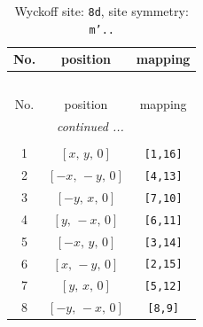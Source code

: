 \documentclass[fleqn,8pt]{jsarticle}
\begin{document}
\renewcommand{\arraystretch}{1.2}
\begin{longtable}{ccc}
\caption{Wyckoff site: {\tt 8d}, site symmetry: {\tt m'..}}
 \\
 \hline \hline
No. & position & mapping \\ \hline \endfirsthead

\multicolumn{2}{l}{\tablename\ \thetable{}} \\
 \hline \hline
No. & position & mapping \\ \hline \endhead

 \hline \hline
\multicolumn{2}{r}{\footnotesize\it continued ...} \\ \endfoot

 \hline \hline
\multicolumn{2}{r}{} \\ \endlastfoot

1 & $\left[ x,\, y,\, 0 \right]$ & {\tt [1,16]} \\ \hline
2 & $\left[ - x,\, - y,\, 0 \right]$ & {\tt [4,13]} \\ \hline
3 & $\left[ - y,\, x,\, 0 \right]$ & {\tt [7,10]} \\ \hline
4 & $\left[ y,\, - x,\, 0 \right]$ & {\tt [6,11]} \\ \hline
5 & $\left[ - x,\, y,\, 0 \right]$ & {\tt [3,14]} \\ \hline
6 & $\left[ x,\, - y,\, 0 \right]$ & {\tt [2,15]} \\ \hline
7 & $\left[ y,\, x,\, 0 \right]$ & {\tt [5,12]} \\ \hline
8 & $\left[ - y,\, - x,\, 0 \right]$ & {\tt [8,9]} \\
\end{longtable}
\renewcommand{\arraystretch}{1.2}
\end{document}
